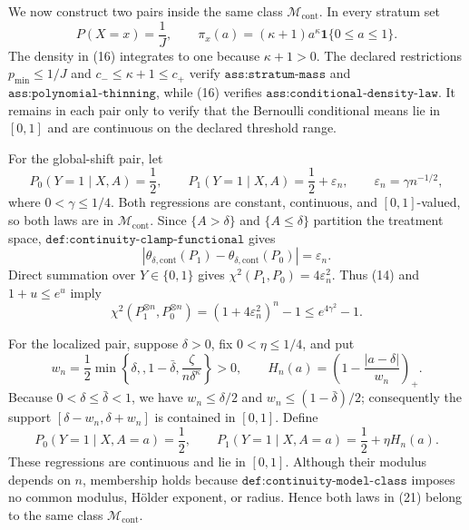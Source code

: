 We now construct two pairs inside the same class \(\mathcal M_{\mathrm{cont}}\).  In every stratum set
\[
 P(X=x)=\frac1J,
 \qquad
 \pi_x(a)=(\kappa+1)a^\kappa\mathbf 1\{0\leq a\leq1\}.
 \tag{16}
\]
The density in (16) integrates to one because \(\kappa+1>0\).  The declared restrictions \(p_{\min}\leq1/J\) and \(c_-\leq\kappa+1\leq c_+\) verify \(\texttt{ass:stratum-mass}\) and \(\texttt{ass:polynomial-thinning}\), while (16) verifies \(\texttt{ass:conditional-density-law}\).  It remains in each pair only to verify that the Bernoulli conditional means lie in \([0,1]\) and are continuous on the declared threshold range.

For the global-shift pair, let
\[
 P_0(Y=1\mid X,A)=\frac12,
 \qquad
 P_1(Y=1\mid X,A)=\frac12+\varepsilon_n,
 \qquad
 \varepsilon_n=\gamma n^{-1/2},
 \tag{17}
\]
where \(0<\gamma\leq1/4\).  Both regressions are constant, continuous, and \([0,1]\)-valued, so both laws are in \(\mathcal M_{\mathrm{cont}}\).  Since \(\{A>\delta\}\) and \(\{A\leq\delta\}\) partition the treatment space, \(\texttt{def:continuity-clamp-functional}\) gives
\[
 |\theta_{\delta,\mathrm{cont}}(P_1)-
   \theta_{\delta,\mathrm{cont}}(P_0)|=\varepsilon_n.
 \tag{18}
\]
Direct summation over \(Y\in\{0,1\}\) gives
\(\chi^2(P_1,P_0)=4\varepsilon_n^2\).  Thus (14) and \(1+u\leq e^u\) imply
\[
 \chi^2(P_1^{\otimes n},P_0^{\otimes n})
 =(1+4\varepsilon_n^2)^n-1
 \leq e^{4\gamma^2}-1.
 \tag{19}
\]

For the localized pair, suppose \(\delta>0\), fix \(0<\eta\leq1/4\), and put
\[
 w_n=\frac12\min\left\{\delta,,1-\bar\delta,
             \frac{\zeta}{n\delta^\kappa}\right\}>0,
 \qquad
 H_n(a)=\left(1-\frac{|a-\delta|}{w_n}\right)_+.
 \tag{20}
\]
Because \(0<\delta\leq\bar\delta<1\), we have \(w_n\leq\delta/2\) and \(w_n\leq(1-\bar\delta)/2\); consequently the support \([\delta-w_n,\delta+w_n]\) is contained in \([0,1]\).  Define
\[
 P_0(Y=1\mid X,A=a)=\frac12,
 \qquad
 P_1(Y=1\mid X,A=a)=\frac12+\eta H_n(a).
 \tag{21}
\]
These regressions are continuous and lie in \([0,1]\).  Although their modulus depends on \(n\), membership holds because \(\texttt{def:continuity-model-class}\) imposes no common modulus, Hölder exponent, or radius.  Hence both laws in (21) belong to the same class \(\mathcal M_{\mathrm{cont}}\).

